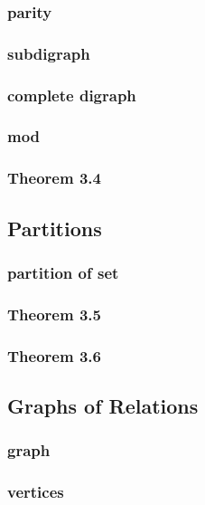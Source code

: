 \documentclass[a4paper]{article}
\begin{document}
\subsubsection*{parity}
\subsubsection*{subdigraph}
\subsubsection*{complete digraph}
\subsubsection*{mod}
\subsubsection*{Theorem 3.4}

\newpage
\subsection{Partitions}   %
\subsubsection*{partition of set}
\subsubsection*{Theorem 3.5}
\subsubsection*{Theorem 3.6}

\newpage
\subsection{Graphs of Relations}   %
\subsubsection*{graph}
\subsubsection*{vertices}
\end{document}
